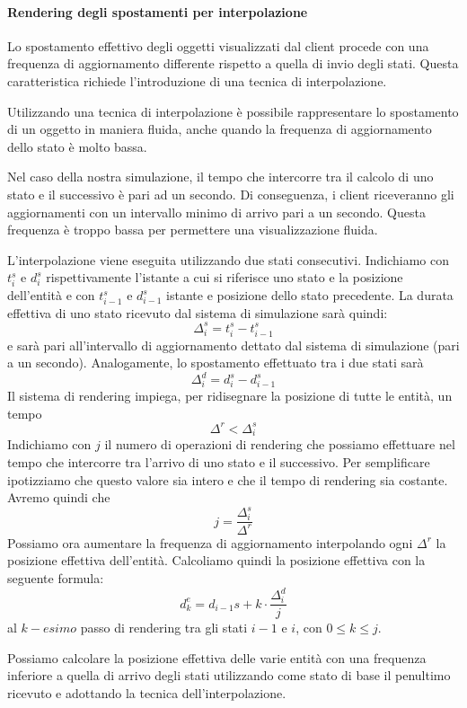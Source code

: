 \paragraph*{Rendering degli spostamenti per interpolazione}
Lo spostamento effettivo degli oggetti visualizzati dal client procede con una
frequenza di aggiornamento differente rispetto a quella di invio degli stati.
Questa caratteristica richiede l'introduzione di una tecnica di interpolazione.

Utilizzando una tecnica di interpolazione è possibile rappresentare lo
spostamento di un oggetto in maniera fluida, anche quando la frequenza di
aggiornamento dello stato è molto bassa.

Nel caso della nostra simulazione, il tempo che intercorre tra il calcolo di
uno stato e il successivo è pari ad un secondo. Di conseguenza, i client
riceveranno gli aggiornamenti con un intervallo minimo di arrivo pari a un
secondo. Questa frequenza è troppo bassa per permettere una visualizzazione
fluida.

L'interpolazione viene eseguita utilizzando due stati consecutivi.
Indichiamo con $t_{i}^{s}$ e $d_{i}^{s}$ rispettivamente l'istante a cui si
riferisce uno stato e la posizione dell'entità e con $t_{i-1}^{s}$ e
$d_{i-1}^{s}$ istante e posizione dello stato precedente. La durata effettiva
di uno stato ricevuto dal sistema di simulazione sarà quindi:
$$\Delta_{i}^{s}=t_{i}^{s}-t_{i-1}^{s}$$ e sarà pari all'intervallo di
aggiornamento dettato dal sistema di simulazione (pari a un secondo).
Analogamente, lo spostamento effettuato tra i due stati sarà
$$\Delta_{i}^{d}=d_{i}^{s}-d_{i-1}^{s}$$ 
Il sistema di rendering impiega, per ridisegnare la posizione di tutte le
entità, un tempo $$\Delta^{r}<\Delta_{i}^{s}$$ 
Indichiamo con $j$ il numero di operazioni di rendering che possiamo effettuare
nel tempo che intercorre tra l'arrivo di uno stato e il successivo. 
Per semplificare ipotizziamo che questo valore sia intero e che il tempo di
rendering sia costante.
Avremo quindi che $$j=\frac{\Delta_{i}^{s}}{\Delta^{r}}$$
Possiamo ora aumentare la frequenza di aggiornamento interpolando ogni
$\Delta^{r}$ la posizione effettiva dell'entità.
Calcoliamo quindi la posizione effettiva con la seguente formula:
$$d_{k}^{e}=d_{i-1}{s}+k\cdot\frac{\Delta_{i}^{d}}{j}$$ al $k-esimo$ passo di
rendering tra gli stati $i-1$ e $i$, con $0 \leq k \leq j$.

Possiamo calcolare la posizione effettiva delle varie entità con una frequenza
inferiore a quella di arrivo degli stati utilizzando come stato di base il
penultimo ricevuto e adottando la tecnica dell'interpolazione.

